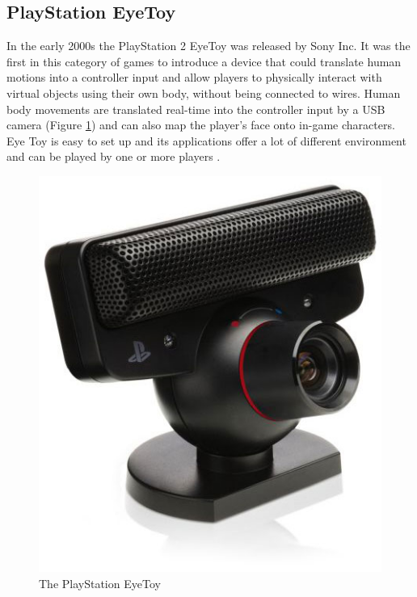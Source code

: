 \subsection{PlayStation EyeToy}
In the early 2000s the PlayStation 2 EyeToy was released by Sony Inc. It was the first in this category of games to introduce a device that could translate human motions into a controller input and allow players to physically interact with virtual objects using their own body, without being connected to wires. Human body movements are translated real-time into the controller input by a USB camera (Figure \ref{fig:PSEyetoy}) and can also map the player’s face onto in-game characters. Eye Toy is easy to set up and its applications offer a lot of different environment and can be played by one or more players \cite{eyetoy}.
\begin{figure}[h!]
\begin{center}
\includegraphics[scale=0.3]{pseyetoy}
\caption[PlayStation EyeToy]{The PlayStation EyeToy}
\label{fig:PSEyetoy}
\end{center}
\end{figure}
